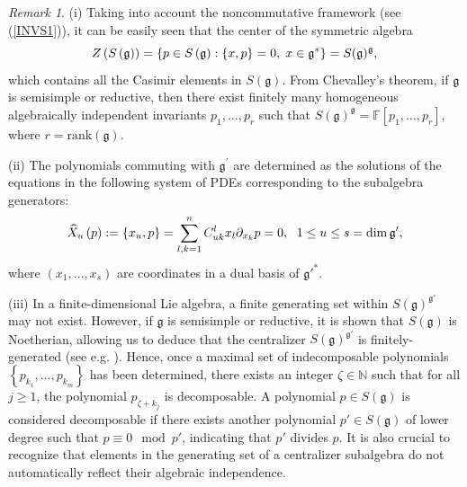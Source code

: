\documentclass[10pt]{amsart}
\theoremstyle{definition}
\theoremstyle{corollary}
\theoremstyle{remark}
\newtheorem{remark}[theorem]{Remark}
\theoremstyle{conclusion}
\begin{document}
\begin{remark}
\label{2.6}
   (i)  Taking into account the noncommutative framework (see (\ref{INVS1})), it can be easily seen that the center of the symmetric algebra 
\begin{equation*}
	Z\left(S\left( \frak{g}\right)\right)=\left\{ p\in S\left( \frak{g}\right) :\left\{ x,p\right\} =0,\;x\in
	 \frak{g}^*  \right\}  = S(\mathfrak{g})^\mathfrak{g},
\end{equation*} which contains all the Casimir  elements in $S(\mathfrak{g}).$ From Chevalley's theorem, if $\mathfrak{g}$ is semisimple or reductive, then there exist finitely many homogeneous algebraically independent invariants $p_1,\ldots,p_r$ such that $S(\mathfrak{g})^{\mathfrak{g}} = \mathbb{F}[p_1,\ldots,p_r]$, where $r = \mathrm{rank} (\mathfrak{g}).$

 (ii) The polynomials  commuting with $\mathfrak{g}^{\prime}$ are determined as the solutions of the equations in the following system of PDEs corresponding to the subalgebra generators:
\begin{equation}
	\widehat{X}_u\left( p\right) :=\left\{ x_u,p\right\} = \sum_{ l,k=1}^n C_{uk}^lx_l%
	\partial_{x_k} p=0,\; \text{ } 1\leq u\leq s=\dim \frak{g}^{\prime},
	\label{mlpa}
\end{equation}
where $(x_1, \dots, x_s)$ are coordinates in a dual basis of $\mathfrak{g}'^*$.
 
 (iii) In a finite-dimensional Lie algebra, a finite generating set within $S(\mathfrak{g})^{\mathfrak{g}'}$ may not exist. However, if $\mathfrak{g}$ is semisimple or reductive, it is shown that $S(\mathfrak{g})$ is Noetherian, allowing us to deduce that the centralizer $S(\mathfrak{g})^{\mathfrak{g}'}$ is finitely-generated (see e.g. \cite[Chapter 2]{MR1451138}). Hence, once a maximal set of indecomposable polynomials $\left\{p_{k_1},\dots ,p_{k_m}\right\}$ has been determined, there exists an integer $\zeta \in \mathbb{N}$ such that for all $j \geq 1$, the polynomial $p_{\zeta+k_j}$ is decomposable. A polynomial $p \in S(\mathfrak{g})$ is considered decomposable if there exists another polynomial $p' \in S(\mathfrak{g})$ of lower degree such that $p \equiv 0 \mod p'$, indicating that $p'$ divides $p$. It is also crucial to recognize that elements in the generating set of a centralizer subalgebra do not automatically reflect their algebraic independence.
\end{remark}

 
\end{document}
